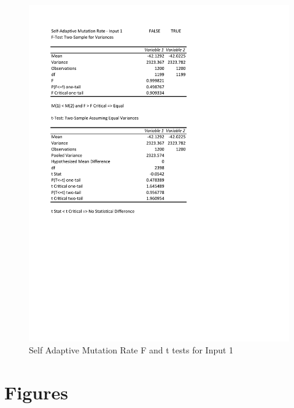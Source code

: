 \documentclass[times]{article}
\begin{document}
	\begin{figure}
		\caption{Self Adaptive Mutation Rate F and t tests for Input 1}
		\label{fig:saMutation1}
		\includegraphics[width=\textwidth]{./t_test/S-AMutationRate1}
	\end{figure}


	\section{Figures}
	
		
\end{document}
